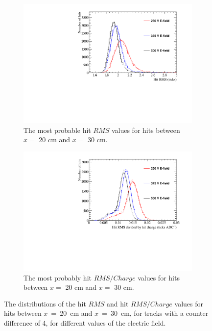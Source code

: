 \begin{figure}
  \centering
  \begin{subfigure}{0.48\textwidth}
    \centering
    \includegraphics[width=\textwidth]{Canvas_RMS_20cm_ElecField}
    \caption{The most probable hit $RMS$ values for hits between $x =$ 20 cm and $x =$ 30 cm.}
  \end{subfigure}%
  \hspace{0.03\textwidth}%
  \begin{subfigure}{0.48\textwidth}
    \centering
    \includegraphics[width=\textwidth]{Canvas_RMS_Q_20cm_ElecField}
    \caption{The most probably hit $RMS/Charge$ values for hits between $x =$ 20 cm and $x =$ 30 cm.}
  \end{subfigure}
  \caption[The distributions of the hit $RMS$ and hit $RMS/Charge$ values for tracks with a counter difference of 4, for different values of the electric field]
          {The distributions of the hit $RMS$ and hit $RMS/Charge$ values for hits between $x$~=~20~cm and $x$~=~30~cm, for tracks with a counter difference of 4, for different values of the electric field.}
  \label{fig:DiffElecStudy_HitFit}
\end{figure}


